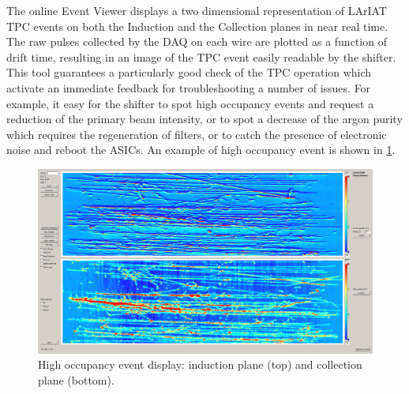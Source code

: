 The online Event Viewer displays a two dimensional representation of LArIAT TPC events on both the Induction and the Collection planes in near real time. The raw pulses collected by the DAQ on each wire are plotted as a function of drift time, resulting in an image of the TPC event easily readable by the shifter. This tool guarantees a particularly good  check of the TPC operation which activate an immediate feedback for troubleshooting a number of issues. For example,  it easy for the shifter to spot high occupancy events and request a reduction of the primary beam intensity, or to spot a decrease of the argon purity which requires the regeneration of filters, or to catch the presence of electronic noise and reboot the ASICs. An example of high occupancy event is shown in \ref{fig:highOcc}.

\begin{figure}[htb]
\centering
\includegraphics[scale=0.2]{Chapter-3/Images/highOccupancy.png}
\caption{High occupancy event display: induction plane (top) and collection plane (bottom).}
\label{fig:highOcc}
\end{figure}


